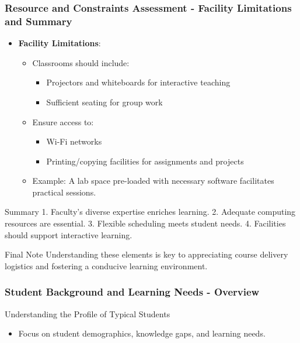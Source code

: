 \documentclass[aspectratio=169]{beamer}
\begin{document}
\begin{frame}[fragile]
    \frametitle{Resource and Constraints Assessment - Facility Limitations and Summary}
    \begin{itemize}
        \item \textbf{Facility Limitations}:
        \begin{itemize}
            \item Classrooms should include:
            \begin{itemize}
                \item Projectors and whiteboards for interactive teaching
                \item Sufficient seating for group work
            \end{itemize}
            \item Ensure access to:
            \begin{itemize}
                \item Wi-Fi networks
                \item Printing/copying facilities for assignments and projects
            \end{itemize}
            \item Example: A lab space pre-loaded with necessary software facilitates practical sessions.
        \end{itemize}
    \end{itemize}
    
    \begin{block}{Summary}
        1. Faculty's diverse expertise enriches learning.
        2. Adequate computing resources are essential.
        3. Flexible scheduling meets student needs.
        4. Facilities should support interactive learning.
    \end{block}
    
    \begin{block}{Final Note}
        Understanding these elements is key to appreciating course delivery logistics and fostering a conducive learning environment.
    \end{block}
\end{frame}

\begin{frame}[fragile]
    \frametitle{Student Background and Learning Needs - Overview}
    \begin{block}{Understanding the Profile of Typical Students}
        \begin{itemize}
            \item Focus on student demographics, knowledge gaps, and learning needs.
        \end{itemize}
    \end{block}
\end{frame}
\end{document}
